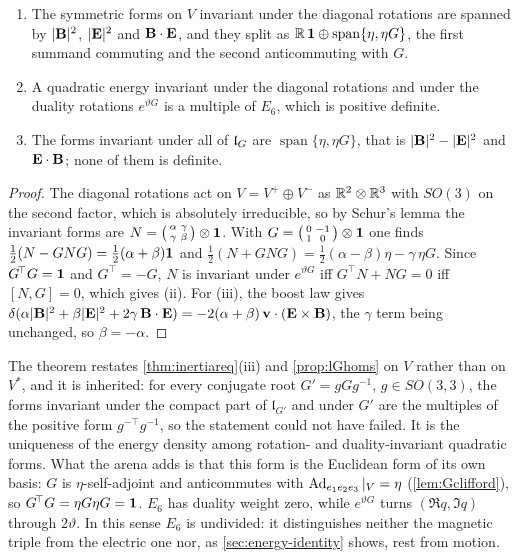 \begin{theorem}
\label{en:unique}
\begin{enumerate}[label=(\roman*),leftmargin=2.2em]
\item The symmetric forms on $V$ invariant under the diagonal rotations are spanned by $|\mathbf B|^2$, $|\mathbf E|^2$ and $\mathbf B\cdot\mathbf E$, and they split as
$\mathbb{R}\,\mathbf 1\oplus\operatorname{span}\{\eta,\eta G\}$, the first summand commuting and the second anticommuting with $G$.
\item A quadratic energy invariant under the diagonal rotations and under the duality rotations $e^{\vartheta G}$ is a multiple of $E_6$, which is
positive definite.
\item The forms invariant under all of $\mathfrak l_G$ are $\operatorname{span}\{\eta,\eta G\}$, that is $|\mathbf B|^2-|\mathbf E|^2$ and $\mathbf E\cdot\mathbf B$; none of them is
definite.
\end{enumerate}
\end{theorem}

\begin{proof}
The diagonal rotations act on $V=V^+\oplus V^-$ as $\mathbb{R}^2\otimes\mathbb{R}^3$ with $SO(3)$ on the second factor, which is absolutely irreducible, so by
Schur's lemma \cite{GoodmanWallach} the invariant forms are $N=\bigl(\begin{smallmatrix}\alpha&\gamma\\ \gamma&\beta\end{smallmatrix}\bigr)\otimes\mathbf 1$.
With $G=\bigl(\begin{smallmatrix}0&-1\\1&0\end{smallmatrix}\bigr)\otimes\mathbf 1$ one finds $\tfrac12(N-GNG)=\tfrac12(\alpha+\beta)\mathbf 1$ and
$\tfrac12(N+GNG)=\tfrac12(\alpha-\beta)\eta-\gamma\,\eta G$. Since $G^{\!\top}G=\mathbf 1$ and $G^{\!\top}=-G$, $N$ is invariant under $e^{\vartheta G}$ iff
$G^{\!\top}N+NG=0$ iff $[N,G]=0$, which gives (ii). For (iii), the boost law gives
$\delta(\alpha|\mathbf B|^2+\beta|\mathbf E|^2+2\gamma\,\mathbf B\cdot\mathbf E)=-2(\alpha+\beta)\,\mathbf v\cdot(\mathbf E\times\mathbf B)$, the $\gamma$ term being unchanged, so $\beta=-\alpha$.
\end{proof}

The theorem restates \cref{thm:inertiareq}(iii) and \cref{prop:lGhoms} on $V$ rather than on $V^*$, and it is inherited: for every conjugate
root $G'=gGg^{-1}$, $g\in SO(3,3)$, the forms invariant under the compact part of $\mathfrak l_{G'}$ and under $G'$ are the multiples of the
positive form $g^{-\top}g^{-1}$, so the statement could not have failed. It is the uniqueness of the energy density among rotation- and
duality-invariant quadratic forms. What the arena adds is that this form is the Euclidean form of its own basis: $G$ is $\eta$-self-adjoint and
anticommutes with $\operatorname{Ad}_{e_1e_2e_3}|_V=\eta$ (\cref{lem:Gclifford}), so $G^{\!\top}G=\eta G\eta G=\mathbf 1$. $E_6$ has duality weight zero, while
$e^{\vartheta G}$ turns $(\Re q,\Im q)$ through $2\vartheta$. In this sense $E_6$ is undivided: it distinguishes neither the magnetic triple from the
electric one nor, as \cref{sec:energy-identity} shows, rest from motion.


